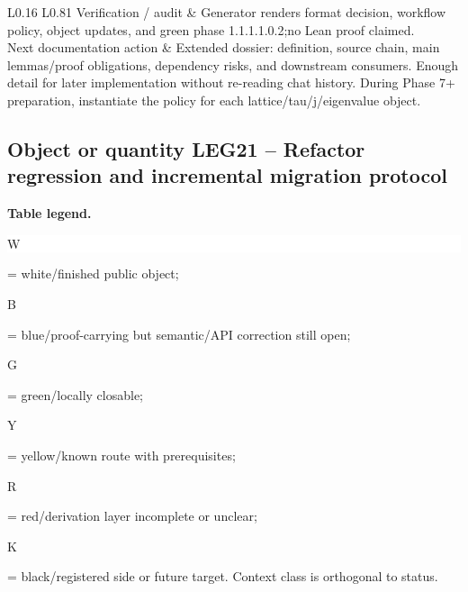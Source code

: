 \begin{longtable}{L{0.16\linewidth} L{0.81\linewidth}}
\hline\addlinespace[0.20em]
Verification /\allowbreak{} audit & Generator renders format decision, workflow policy, object updates, and green phase 1.1.1.1.0.2;\newline no Lean proof claimed.\\
\hline\addlinespace[0.20em]
Next documentation action & Extended dossier: definition, source chain, main lemmas/\allowbreak{}proof obligations, dependency risks, and downstream consumers. Enough detail for later implementation without re-reading chat history. During Phase 7+ preparation, instantiate the policy for each lattice/\allowbreak{}tau/\allowbreak{}j/\allowbreak{}eigenvalue object.\\
\hline\addlinespace[0.20em]
\end{longtable}
\subsection*{Object or quantity LEG21 -- Refactor regression and incremental migration protocol}
\hypertarget{objproof:LEG21}{}
\par\smallskip\noindent\begin{minipage}{0.99\linewidth}\footnotesize\raggedright\textbf{Table legend.} \colorbox{white}{\strut W} = white/finished public object; \colorbox{cyan!20}{\strut B} = blue/proof-carrying but semantic/API correction still open; \colorbox{green!18}{\strut G} = green/locally closable; \colorbox{yellow!25}{\strut Y} = yellow/known route with prerequisites; \colorbox{red!20}{\strut R} = red/derivation layer incomplete or unclear; \colorbox{black!18}{\strut K} = black/registered side or future target. Context class is orthogonal to status.\end{minipage}\par\vspace{0.25em}
